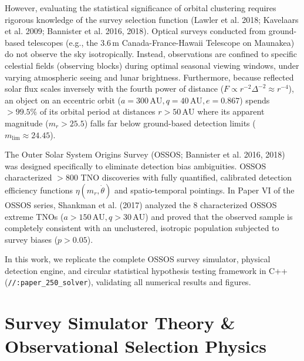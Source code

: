 \documentclass[11pt,a4paper]{article}
\begin{document}
However, evaluating the statistical significance of orbital clustering requires rigorous knowledge of the survey selection function (Lawler et al. 2018; Kavelaars et al. 2009; Bannister et al. 2016, 2018). Optical surveys conducted from ground-based telescopes (e.g., the 3.6\,m Canada-France-Hawaii Telescope on Maunakea) do not observe the sky isotropically. Instead, observations are confined to specific celestial fields (observing blocks) during optimal seasonal viewing windows, under varying atmospheric seeing and lunar brightness. Furthermore, because reflected solar flux scales inversely with the fourth power of distance ($F \propto r^{-2} \Delta^{-2} \approx r^{-4}$), an object on an eccentric orbit ($a = 300\,\text{AU}, q = 40\,\text{AU}, e = 0.867$) spends $>99.5\%$ of its orbital period at distances $r > 50\,\text{AU}$ where its apparent magnitude ($m_r > 25.5$) falls far below ground-based detection limits ($m_{\text{lim}} \approx 24.45$).

The Outer Solar System Origins Survey (OSSOS; Bannister et al. 2016, 2018) was designed specifically to eliminate detection bias ambiguities. OSSOS characterized $>800$ TNO discoveries with fully quantified, calibrated detection efficiency functions $\eta(m_r, \dot{\theta})$ and spatio-temporal pointings. In Paper VI of the OSSOS series, Shankman et al. (2017) analyzed the 8 characterized OSSOS extreme TNOs ($a > 150\,\text{AU}, q > 30\,\text{AU}$) and proved that the observed sample is completely consistent with an unclustered, isotropic population subjected to survey biases ($p > 0.05$).

In this work, we replicate the complete OSSOS survey simulator, physical detection engine, and circular statistical hypothesis testing framework in C++ (\texttt{//:paper\_250\_solver}), validating all numerical results and figures.

\section{Survey Simulator Theory \& Observational Selection Physics}
\end{document}
